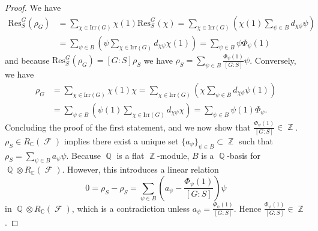 \documentclass[12pt]{article}
\DeclareMathOperator{\C}{\mathbb{C}}
\DeclareMathOperator{\Q}{\mathbb{Q}}
\DeclareMathOperator{\Z}{\mathbb{Z}}
\DeclareMathOperator{\sF}{\mathcal{F}}
\theoremstyle{plain}
\theoremstyle{definition}
\begin{document}
\begin{proof}
We have
\begin{align*}
\mathrm{Res}^G_S(\rho_G) &= \sum_{\chi \in \text{Irr}(G)} \chi(1)\mathrm{Res}^G_S(\chi) = \sum_{\chi \in \text{Irr}(G)}\left(\chi(1)\sum_{\psi \in B} d_{\chi\phi}\psi\right) \\ 
&= \sum_{\psi \in B} \left(\psi \sum_{\chi \in \text{Irr}(G)} d_{\chi\psi}\chi(1)\right) = \sum_{\psi \in B} \psi\Phi_{\psi}(1)
\end{align*}
and because $\mathrm{Res}^G_S(\rho_G) = [G:S]\rho_S$ we have $\rho_S = \displaystyle \sum_{\psi \in B} \frac{\Phi_{\psi}(1)}{[G:S]}\psi$. Conversely, we have
{\allowdisplaybreaks\begin{align*}
\rho_G &= \sum_{\chi \in \text{Irr}(G)} \chi(1)\chi = \sum_{\chi \in \text{Irr}(G)}\left(\chi\sum_{\psi \in B} d_{\chi\phi}\psi(1)\right) \\ 
&= \sum_{\psi \in B} \left(\psi(1) \sum_{\chi \in \text{Irr}(G)} d_{\chi\psi}\chi\right) = \sum_{\psi \in B} \psi(1)\Phi_{\psi}.
\end{align*}}
Concluding the proof of the first statement, and we now show that $\frac{\Phi_{\psi}(1)}{[G:S]} \in \Z$. $\rho_S \in R_{\C}(\sF)$ implies there exist a unique set $\{a_{\psi}\}_{\psi \in B} \subset \Z$ such that $\rho_S = \sum_{\psi \in B} a_{\psi}\psi$. Because $\Q$ is a flat $\Z$-module, $B$ is a $\Q$-basis for $\Q \otimes R_{\C}(\sF)$. However, this introduces a linear relation 
\[0 = \rho_S-\rho_S = \sum_{\psi \in B}\left(a_{\psi}-\frac{\Phi_{\psi}(1)}{[G:S]}\right)\psi\]
in $\Q \otimes R_{\C}(\sF)$, which is a contradiction unless $a_{\psi} = \frac{\Phi_{\psi}(1)}{[G : S]}$. Hence $\frac{\Phi_{\psi}(1)}{[G:S]} \in \Z$.
\end{proof}
\end{document}
